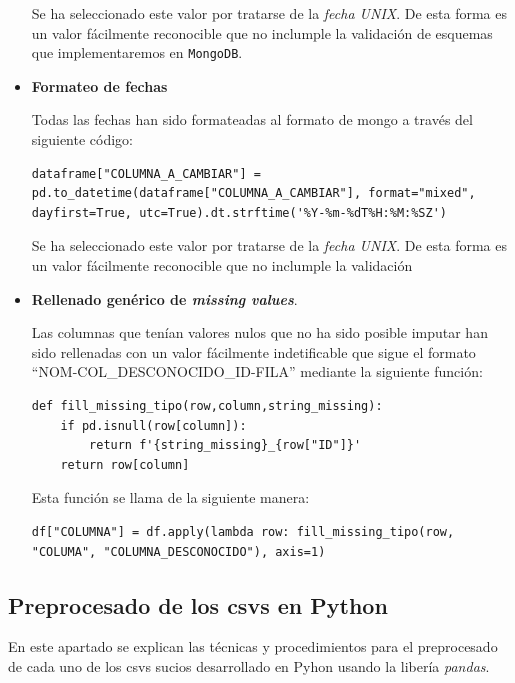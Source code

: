 \documentclass[]{article}
\begin{document}
\begin{itemize}
    Se ha seleccionado este valor por tratarse de la \textit{fecha UNIX}. De
    esta forma es un valor fácilmente reconocible que no inclumple la validación
    de esquemas que implementaremos en \texttt{MongoDB}.

    \item \textbf{Formateo de fechas}

    Todas las fechas han sido formateadas al formato de mongo a través del siguiente código:

    \begin{lstlisting}[caption=Formateo de fechas"]
dataframe["COLUMNA_A_CAMBIAR"] = pd.to_datetime(dataframe["COLUMNA_A_CAMBIAR"], format="mixed", dayfirst=True, utc=True).dt.strftime('%Y-%m-%dT%H:%M:%SZ')
    \end{lstlisting}

    Se ha seleccionado este valor por tratarse de la \textit{fecha UNIX}. De
    esta forma es un valor fácilmente reconocible que no inclumple la validación
    \item \textbf{Rellenado genérico de \textit{missing values}}. 
    
    Las columnas que tenían valores nulos que no ha sido posible imputar han sido rellenadas con un valor fácilmente indetificable que sigue el formato ``NOM-COL\_DESCONOCIDO\_ID-FILA'' mediante la siguiente función:

    \begin{lstlisting}[caption=Inputacion de valores faltantes desconocidos]
def fill_missing_tipo(row,column,string_missing):
    if pd.isnull(row[column]):
        return f'{string_missing}_{row["ID"]}'
    return row[column]
    \end{lstlisting}

    Esta función se llama de la siguiente manera:

    \begin{lstlisting}[caption=llamada a la función para rellenar valores faltantes]
df["COLUMNA"] = df.apply(lambda row: fill_missing_tipo(row, "COLUMA", "COLUMNA_DESCONOCIDO"), axis=1)
    \end{lstlisting}

\end{itemize}

\subsection{Preprocesado de los csvs en Python}
\label{subsec:preprocessespecifico}
En este apartado se explican las técnicas y procedimientos para el preprocesado de cada uno de los csvs sucios desarrollado en Pyhon usando la libería \textit{pandas}.
\end{document}
